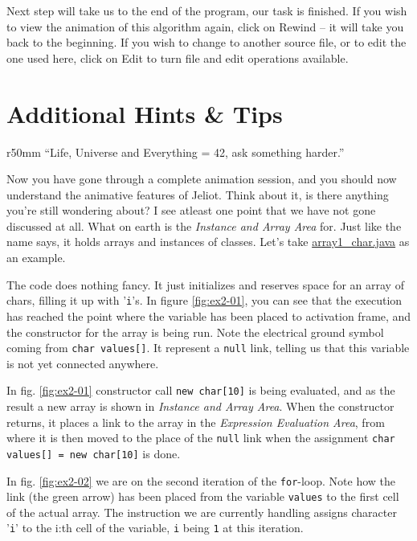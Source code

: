 \documentclass[a4paper,12pt,english]{article}
\newcommand{\jel}{Jeliot}
\newcommand{\file}{\url}
\newcommand{\p}[1]{\texttt{#1}}
\newcommand{\bu}[1]{\textsf{#1}}
\begin{document}
Next step will take us to the end of the program, our task is finished. If you wish to view the animation of this algorithm again, click on \bu{Rewind} -- it will take you back to the beginning. If you wish to change to another source file, or to edit the one used here, click on \bu{Edit} to turn file and edit operations available.


\section{Additional Hints \& Tips}

\begin{wrapfigure}[8]{r}{50mm}
\vspace{-15pt}
``Life, Universe and Everything = 42, ask something harder.''
\end{wrapfigure}

Now you have gone through a complete animation session, and you should now understand the animative features of \jel{}. Think about it, is there anything you're still wondering about? I see atleast one point that we have not gone discussed at all. What on earth is the \emph{Instance and Array Area} for. Just like the name says, it holds arrays and instances of classes. Let's take \file{array1_char.java} as an example. 

The code does nothing fancy. It just initializes and reserves space for an array of chars, filling it up with '\p{i}'s. In figure \ref{fig:ex2-01}, you can see that the execution has reached the point where the variable has been placed to activation frame, and the constructor for the array is being run. Note the electrical ground symbol coming from \p{char values[]}. It represent a \p{null} link, telling us that this variable is not yet connected anywhere. 

In fig. \ref{fig:ex2-01} constructor call \p{new char[10]} is being evaluated, and as the result a new array is shown in \emph{Instance and Array Area}. When the constructor returns, it places a link to the array in the \emph{Expression Evaluation Area}, from where it is then moved to the place of the \p{null} link when the assignment \p{char values[] = new char[10]} is done. 

In fig. \ref{fig:ex2-02} we are on the second iteration of the \p{for}-loop. Note how the link (the green arrow) has been placed from the variable \p{values} to the first cell of the actual array. The instruction we are currently handling assigns character '\p{i}' to the i:th cell of the variable, \p{i} being \p{1} at this iteration.
\end{document}
